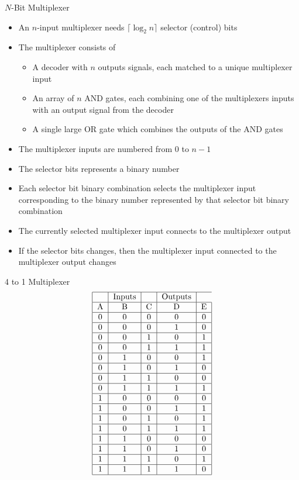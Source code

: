 \documentclass[12pt]{article}
\begin{document}
$N$-Bit Multiplexer \begin{itemize} 
\item An $n$-input multiplexer needs $\lceil \log_2 n \rceil$ selector (control) bits 
\item The multiplexer consists of \begin{itemize} 
\item A decoder with $n$ outputs signals, each matched to a unique multiplexer input
\item An array of $n$ AND gates, each combining one of the multiplexers inputs with an output signal from the decoder 
\item A single large OR gate which combines the outputs of the AND gates 
\end{itemize} 
\item The multiplexer inputs are numbered from 0 to $n - 1$ 
\item The selector bits represents a binary number 
\item Each selector bit binary combination selects the multiplexer input corresponding to the binary number represented by that selector bit binary combination 
\item The currently selected multiplexer input connects to the multiplexer output 
\item If the selector bits changes, then the multiplexer input connected to the multiplexer output changes 
\end{itemize} 
4 to 1 Multiplexer
$$\begin{tabular}{|c|c|c|c|c|} \hline 
& Inputs & & Outputs \\ \hline
A & B & C & D & E \\ \hline
0&0&0&0&0 \\ \hline 
0&0&0&1&0 \\ \hline 
0&0&1&0&1 \\ \hline 
0&0&1&1&1 \\ \hline 
0&1&0&0&1 \\ \hline 
0&1&0&1&0 \\ \hline 
0&1&1&0&0 \\ \hline 
0&1&1&1&1 \\ \hline 
1&0&0&0&0 \\ \hline 
1&0&0&1&1 \\ \hline 
1&0&1&0&1 \\ \hline 
1&0&1&1&1 \\ \hline 
1&1&0&0&0 \\ \hline 
1&1&0&1&0 \\ \hline 
1&1&1&0&1 \\ \hline 
1&1&1&1&0 \\ \hline \end{tabular} $$ 
\end{document}
